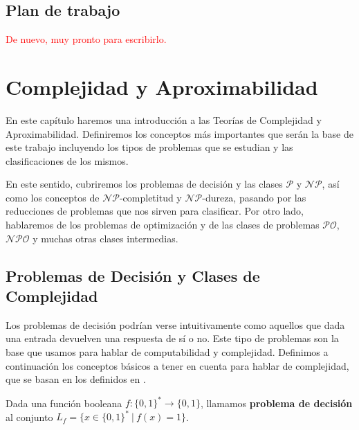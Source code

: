 \section{Plan de trabajo}
\textcolor{red}{De nuevo, muy pronto para escribirlo.}

\chapter{Complejidad y Aproximabilidad}
En este capítulo haremos una introducción a las Teorías de Complejidad y Aproximabilidad. Definiremos los conceptos más importantes que serán la base de este trabajo incluyendo los tipos de problemas que se estudian y las clasificaciones de los mismos.

En este sentido, cubriremos los problemas de decisión y las clases $\mathcal{P}$ y $\mathcal{NP}$, así como los conceptos de $\mathcal{NP}$-completitud y $\mathcal{NP}$-dureza, pasando por las reducciones de problemas que nos sirven para clasificar. Por otro lado, hablaremos de los problemas de optimización y de las clases de problemas $\mathcal{PO}$, $\mathcal{NPO}$ y muchas otras clases intermedias.

\section{Problemas de Decisión y Clases de Complejidad}
Los problemas de decisión podrían verse intuitivamente como aquellos que dada una entrada devuelven una respuesta de sí o no. Este tipo de problemas son la base que usamos para hablar de computabilidad y complejidad. Definimos a continuación los conceptos básicos a tener en cuenta para hablar de complejidad, que se basan en los definidos en \cite{compcomplexbarak}.

\begin{definicion}
Dada una función booleana $f: \{0,1\}^* \rightarrow \{0,1\}$, llamamos \textbf{problema de decisión} al conjunto $L_f = \{x \in \{0,1\}^{*} \ | \ f(x) = 1\}$.
\end{definicion}

